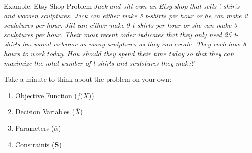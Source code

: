 \documentclass[10pt, aspectratio=169]{beamer}
\begin{document}
\begin{frame}[t]{Example: Etsy Shop Problem}
    \textit{Jack and Jill own an Etsy shop that sells t-shirts and wooden sculptures. Jack can either make 5 t-shirts per hour or he can make 2 sculptures per hour. Jill can either make 9 t-shirts per hour or she can make 3 sculptures per hour. Their most recent order indicates that they only need 25 t-shirts but would welcome as many sculptures as they can create. They each how 8 hours to work today. How should they spend their time today so that they can maximize the total number of t-shirts and sculptures they make?}

    \vspace{1.0cm}
    
    Take a minute to think about the problem on your own:
    \begin{enumerate}
        \item Objective Function ($f(\overline{X}$))
        \item Decision Variables ($\overline{X}$)
        \item Parameters ($\overline{\alpha}$)
        \item Constraints ($\textbf{S}$)
    \end{enumerate}
\end{frame}
\end{document}
